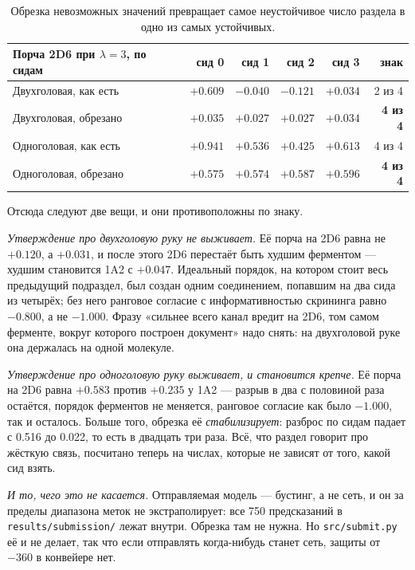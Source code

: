 \begin{table}[htbp]\centering\small
\begin{tabularx}{\textwidth}{@{}Xrrrrr@{}}
\toprule
Порча 2D6 при $\lambda = 3$, по сидам & сид 0 & сид 1 & сид 2 & сид 3 & знак \\
\midrule
Двухголовая, как есть   & $+0.609$ & $-0.040$ & $-0.121$ & $+0.034$ & 2 из 4 \\
Двухголовая, обрезано   & $+0.035$ & $+0.027$ & $+0.027$ & $+0.034$ & \textbf{4 из 4} \\
\addlinespace[2pt]
Одноголовая, как есть   & $+0.941$ & $+0.536$ & $+0.425$ & $+0.613$ & 4 из 4 \\
Одноголовая, обрезано   & $+0.575$ & $+0.574$ & $+0.587$ & $+0.596$ & \textbf{4 из 4} \\
\bottomrule
\end{tabularx}
\caption{Обрезка невозможных значений превращает самое неустойчивое число раздела в одно из
самых устойчивых.}
\label{tab:clip}
\end{table}

Отсюда следуют две вещи, и они противоположны по знаку.

\emph{Утверждение про двухголовую руку не выживает.} Её порча на 2D6 равна не $+0.120$, а
$+0.031$, и после этого 2D6 перестаёт быть худшим ферментом --- худшим становится 1A2 с
$+0.047$. Идеальный порядок, на котором стоит весь предыдущий подраздел, был создан одним
соединением, попавшим на два сида из четырёх; без него ранговое согласие с информативностью
скрининга равно $-0.800$, а не $-1.000$. Фразу «сильнее всего канал вредит на 2D6, том самом
ферменте, вокруг которого построен документ» надо снять: на двухголовой руке она держалась на
одной молекуле.

\emph{Утверждение про одноголовую руку выживает, и становится крепче.} Её порча на 2D6 равна
$+0.583$ против $+0.235$ у 1A2 --- разрыв в два с половиной раза остаётся, порядок ферментов
не меняется, ранговое согласие как было $-1.000$, так и осталось. Больше того, обрезка её
\emph{стабилизирует}: разброс по сидам падает с 0.516 до 0.022, то есть в двадцать три раза.
Всё, что раздел говорит про жёсткую связь, посчитано теперь на числах, которые не зависят от
того, какой сид взять.

\emph{И то, чего это не касается.} Отправляемая модель --- бустинг, а не сеть, и он за
пределы диапазона меток не экстраполирует: все 750 предсказаний в
\texttt{results/submission/} лежат внутри. Обрезка там не нужна. Но \texttt{src/submit.py}
её и не делает, так что если отправлять когда-нибудь станет сеть, защиты от $-360$ в
конвейере нет.

